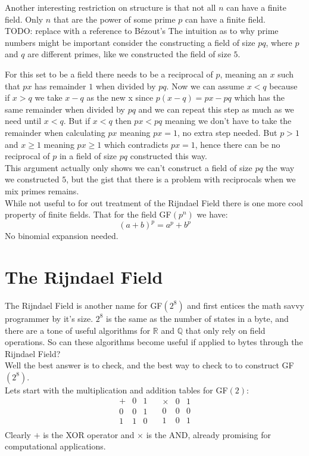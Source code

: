 Another interesting restriction on structure is that not all $n$ can have a finite field.
Only $n$ that are the power of some prime $p$ can have a finite field.
\\

TODO: replace with a reference to Bézout's
The intuition as to why prime numbers might be important consider the constructing a field of size $pq$, where $p$ and $q$ are different primes, like we constructed the field of size $5$.

For this set to be a field there needs to be a reciprocal of $p$, meaning an $x$ such that $px$ has remainder $1$ when divided by $pq$. 
Now we can assume $x < q$ because if $x>q$ we take $x-q$ as the new x since $p(x-q) = px-pq$ which has the same remainder when divided by $pq$ and we can repeat this step as much as we need until $x < q$.
But if $x <q$ then $px < pq$ meaning we don't have to take the remainder when calculating $px$ meaning $px = 1$, no extra step needed.
But $p>1$ and $x\geq 1$ meaning $px \geq 1$ which contradicts $px = 1$, 
hence there can be no reciprocal of $p$ in a field of size $pq$ constructed this way.
\\

This argument actually only shows we can't construct a field of size $pq$ the way we constructed $5$,
but the gist that there is a problem with reciprocals when we mix primes remains.
\\

While not useful to for out treatment of the Rijndael Field there is one more cool property of finite fields.
That for the field GF$(p^n)$ we have:
\[(a+b)^p = a^p+b^p\]
No binomial expansion needed.
\section{The Rijndael Field}
The Rijndael Field is another name for GF$(2^8)$ and first entices the math savvy programmer by it's size.
$2^8$ is the same as the number of states in a byte,
and there are a tone of useful algorithms for $\mathbb{R}$ and $\mathbb{Q}$ that only rely on field operations.
So can these algorithms become useful if applied to bytes through the Rijndael Field?
\\

Well the best answer is to check,
and the best way to check to to construct GF$(2^8)$.
\\

Lets start with the multiplication and addition tables for GF$(2)$:
\[
\begin{array}{c|cc}
	+& 0 & 1 \\
	\hline 
	0&0&1\\
	1&1&0\\
\end{array}
\quad
\begin{array}{c|ccccc}
	\times & 0 & 1 \\
	\hline 
	0&0&0\\
	1&0&1\\
\end{array}
\]
Clearly $+$ is the XOR operator and $\times$ is the AND, already promising for computational applications.
\\


